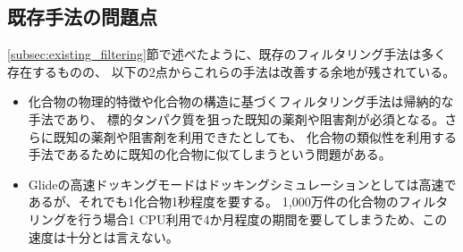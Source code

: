 \subsection{既存手法の問題点}
\ref{subsec:existing_filtering}節で述べたように、既存のフィルタリング手法は多く存在するものの、
以下の2点からこれらの手法は改善する余地が残されている。
\begin{itemize}
\item 化合物の物理的特徴や化合物の構造に基づくフィルタリング手法は帰納的な手法であり、
	標的タンパク質を狙った既知の薬剤や阻害剤が必須となる。さらに既知の薬剤や阻害剤を利用できたとしても、
	化合物の類似性を利用する手法であるために既知の化合物に似てしまうという問題がある。	
\item Glideの高速ドッキングモードはドッキングシミュレーションとしては高速であるが、それでも1化合物1秒程度を要する。
	1,000万件の化合物のフィルタリングを行う場合1 CPU利用で4か月程度の期間を要してしまうため、この速度は十分とは言えない。
\end{itemize}
